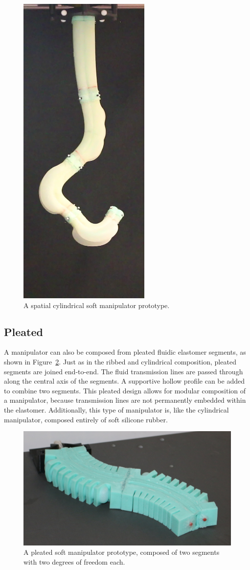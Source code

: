 \begin{figure}[htb]
\centering
\includegraphics[width=0.3\columnwidth]{Figures/manipulators/CshapeTight.eps}
\caption[A cylindrical spatial soft manipulator prototype.]{A spatial cylindrical soft manipulator prototype.} \label{fig:spatial_cylindrical_manipulator}
\end{figure}

\subsection{Pleated}
\label{subsec:Manipulators, Pleated}
A manipulator can also be composed from pleated fluidic elastomer segments, as shown in Figure~\ref{fig:pleated_manipulator}.
Just as in the ribbed and cylindrical composition, pleated segments are joined end-to-end.
The fluid transmission lines are passed through along the central axis of the segments.
A supportive hollow profile can be added to combine two segments.
This pleated design allows for modular composition of a manipulator, because transmission lines are not permanently embedded within the elastomer.
Additionally, this type of manipulator is, like the cylindrical manipulator, composed entirely of soft silicone rubber.
\begin{figure}[htb]
\centering
\includegraphics[width=\columnwidth]{Figures/manipulators/pleated_manipulator_real}
\caption[A pleated soft manipulator prototype.]{A pleated soft manipulator prototype, composed of two segments with two degrees of freedom each.}
\label{fig:pleated_manipulator}
\end{figure} 